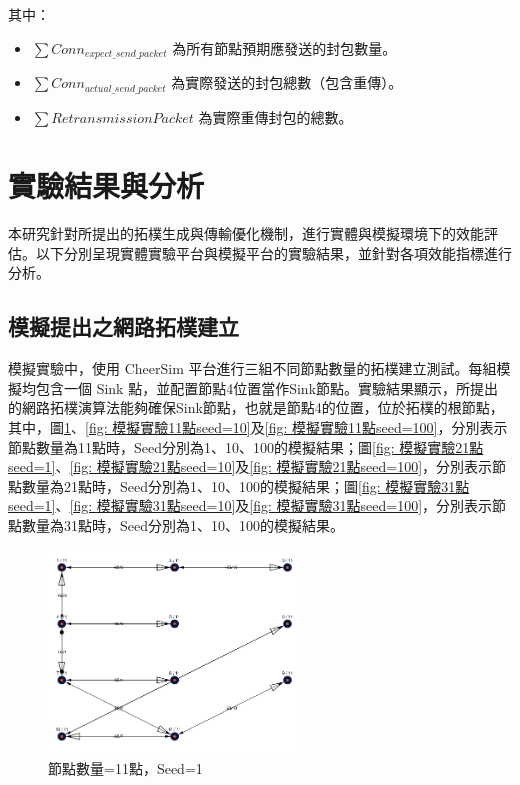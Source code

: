 \begin{ZhChapter}
其中：
\begin{itemize}
    \item $\sum Conn_{expect\_send\_packet}$ 為所有節點預期應發送的封包數量。
    \item $\sum Conn_{actual\_send\_packet}$ 為實際發送的封包總數（包含重傳）。
    \item $\sum RetransmissionPacket$ 為實際重傳封包的總數。
\end{itemize}

\section{實驗結果與分析}
本研究針對所提出的拓樸生成與傳輸優化機制，進行實體與模擬環境下的效能評估。以下分別呈現實體實驗平台與模擬平台的實驗結果，並針對各項效能指標進行分析。

\subsection{模擬提出之網路拓樸建立}
模擬實驗中，使用 CheerSim 平台進行三組不同節點數量的拓樸建立測試。每組模擬均包含一個 Sink 點，並配置節點4位置當作Sink節點。實驗結果顯示，所提出的網路拓樸演算法能夠確保Sink節點，也就是節點4的位置，位於拓樸的根節點，其中，圖\ref{fig: 模擬實驗11點seed=1}、\ref{fig: 模擬實驗11點seed=10}及\ref{fig: 模擬實驗11點seed=100}，分別表示節點數量為11點時，Seed分別為1、10、100的模擬結果；圖\ref{fig: 模擬實驗21點seed=1}、\ref{fig: 模擬實驗21點seed=10}及\ref{fig: 模擬實驗21點seed=100}，分別表示節點數量為21點時，Seed分別為1、10、100的模擬結果；圖\ref{fig: 模擬實驗31點seed=1}、\ref{fig: 模擬實驗31點seed=10}及\ref{fig: 模擬實驗31點seed=100}，分別表示節點數量為31點時，Seed分別為1、10、100的模擬結果。

\begin{figure}[H]
    \centering
    \includegraphics[width = 0.6\textwidth]{image/模擬實驗11點seed=1.png}
    \caption{節點數量=11點，Seed=1}
    \label{fig: 模擬實驗11點seed=1}
\end{figure}


\end{ZhChapter}
